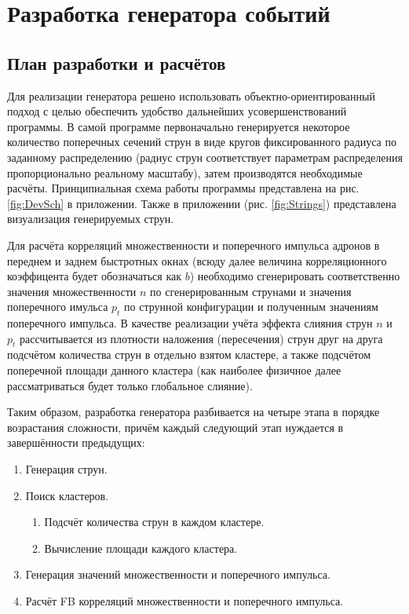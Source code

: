 \section{Разработка генератора событий}
\subsection{План разработки и расчётов}
Для реализации генератора решено использовать объектно-ориентированный подход с целью обеспечить удобство дальнейших усовершенствований программы. В самой программе первоначально генерируется некоторое количество поперечных сечений струн в виде кругов фиксированного радиуса по заданному распределению (радиус струн соответствует параметрам распределения пропорционально реальному масштабу), затем производятся необходимые расчёты. Принципиальная схема работы программы представлена на рис. \ref{fig:DevSch} в приложении. Также в приложении (рис. \ref{fig:Strings}) представлена визуализация генерируемых струн. 

Для расчёта корреляций множественности и поперечного импульса адронов в переднем и заднем быстротных окнах (всюду далее величина корреляционного коэффицента будет обозначаться как $b$) необходимо сгенерировать соответственно значения множественности $n$ по сгенерированным струнами и значения поперечного имульса $p_t$ по струнной конфигурации и полученным значениям поперечного импульса. В качестве реализации учёта эффекта слияния струн $n$ и $p_t$ рассчитывается из плотности наложения (пересечения) струн друг на друга подсчётом количества струн в отдельно взятом кластере, а также подсчётом поперечной площади данного кластера (как наиболее физичное далее рассматриваться будет только глобальное слияние). 

Таким образом, разработка генератора разбивается на четыре этапа в порядке возрастания сложности, причём каждый следующий этап нуждается в завершённости предыдущих:
\begin{enumerate}[label=\arabic*.]
\item	Генерация струн.
\item	Поиск кластеров.
	\begin{enumerate}
	\item	Подсчёт количества струн в каждом кластере.
	\item	Вычисление площади каждого кластера.
	\end{enumerate}
\item	Генерация значений множественности и поперечного импульса.
\item	Расчёт FB корреляций множественности и поперечного импульса.
\end{enumerate}
